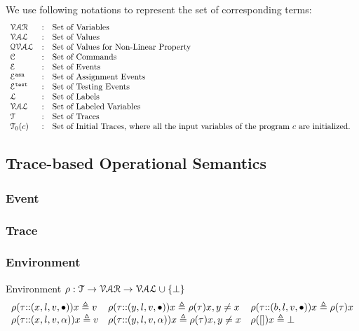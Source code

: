 We use following notations to represent the set of corresponding terms:
\[
\begin{array}{lll}
\mathcal{VAR} & : & \mbox{Set of Variables}  
\\ 
%
\mathcal{VAL} & : & \mbox{Set of Values} 
\\ 
%
\mathcal{QVAL} & : & \mbox{Set of Values for Non-Linear Property} 
\\ 
%
\cdom & : & \mbox{Set of Commands} 
\\ 
%
\eventset  & : & \mbox{Set of Events}  
\\
%
\eventset^{\asn}  & : & \mbox{Set of Assignment Events}  
\\
%
\eventset^{\test}  & : & \mbox{Set of Testing Events}  
\\
%
\ldom  & : & \mbox{Set of Labels}  
\\
\mathcal{VAL}  & : & \mbox{Set of Labeled Variables}  
\\
%
{\mathcal{T}} & : & \mbox{Set of Traces}
\\
%
\mathcal{T}_0(c) & : & \mbox{Set of Initial Traces, where all the input variables of the program $c$ are initialized.
}
\end{array}
\]
%
%
%
%
%
\subsection{Trace-based Operational Semantics}
\subsubsection{Event}

\subsubsection{Trace}

\subsubsection{Environment}
Environment $ \rho : {\mathcal{T}}  \to \mathcal{VAR} \to \mathcal{VAL} \cup \{\bot\}$
\[
\begin{array}{lll}
\rho(\mathtt{\tau}  {\small ::} (x, l, v, \bullet)) x \triangleq v
&
\rho(\mathtt{\tau} {\small ::} (y, l, v, \bullet)) x \triangleq \rho(\mathtt{\tau}) x, y \neq x
&
\rho(\mathtt{\tau} {\small ::} (b, l, v, \bullet)) x \triangleq \rho(\mathtt{\tau}) x
\\
\rho(\mathtt{\tau} {\small ::} (x, l, v, \alpha)) x \triangleq v
&
\rho(\mathtt{\tau} {\small ::} (y, l, v, \alpha)) x \triangleq \rho(\mathtt{\tau}) x, y \neq x
&
\rho({[]} ) x \triangleq \bot
\end{array}
\]

